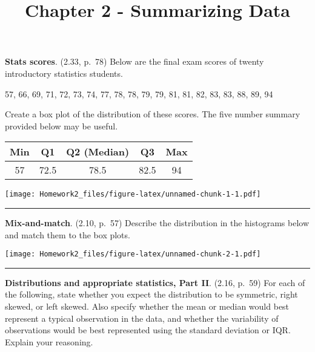 \documentclass[]{article}
\title{Chapter 2 - Summarizing Data}
\author{}
\date{}
\begin{document}
\maketitle

\textbf{Stats scores}. (2.33, p.~78) Below are the final exam scores of
twenty introductory statistics students.

57, 66, 69, 71, 72, 73, 74, 77, 78, 78, 79, 79, 81, 81, 82, 83, 83, 88,
89, 94

Create a box plot of the distribution of these scores. The five number
summary provided below may be useful.

\begin{center}
\renewcommand\arraystretch{1.5}
\begin{tabular}{ccccc}
Min & Q1    & Q2 (Median)   & Q3    & Max \\
\hline
57  & 72.5  & 78.5          & 82.5  & 94 \\
\end{tabular}
\end{center}

\texttt{[image: Homework2\_files/figure-latex/unnamed-chunk-1-1.pdf]}

\begin{center}\rule{0.5\linewidth}{\linethickness}\end{center}

\clearpage

\textbf{Mix-and-match}. (2.10, p.~57) Describe the distribution in the
histograms below and match them to the box plots.

\texttt{[image: Homework2\_files/figure-latex/unnamed-chunk-2-1.pdf]}

\begin{center}\rule{0.5\linewidth}{\linethickness}\end{center}

\clearpage

\textbf{Distributions and appropriate statistics, Part II}. (2.16,
p.~59) For each of the following, state whether you expect the
distribution to be symmetric, right skewed, or left skewed. Also specify
whether the mean or median would best represent a typical observation in
the data, and whether the variability of observations would be best
represented using the standard deviation or IQR. Explain your reasoning.
\end{document}
